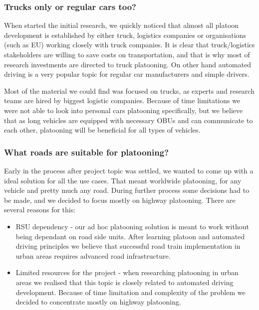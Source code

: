 \subsubsection{Trucks only or regular cars too?}
When started the initial research, we quickly noticed that almost all platoon development is established by either truck, logistics companies or organisations (such as EU) working closely with truck companies. It is clear that truck/logistics stakeholders are willing to save costs on transportation, and that is why most of research investments are directed to truck platooning. On other hand automated driving is a very popular topic for regular car manufacturers and simple drivers.\par
Most of the material we could find was focused on trucks, as experts and research teams are hired by biggest logistic companies. Because of time limitations we were not able to look into personal cars platooning specifically, but we believe that as long vehicles are equipped with necessary \acrshort{OBU}s and can communicate to each other, platooning will be beneficial for all types of vehicles.\par
%
\subsubsection{What roads are suitable for platooning?}
Early in the process after project topic was settled, we wanted to come up with a ideal solution for all the use cases. That meant worldwide platooning, for any vehicle and pretty much any road. During further process some decisions had to be made, and we decided to focus mostly on highway platooning. There are several reasons for this:
\begin{itemize}
    \item \acrshort{RSU} dependency - our ad hoc platooning solution is meant to work without being dependant on road side units. After learning platoon and automated driving principles we believe that successful road train implementation in urban areas requires advanced road infrastructure.
    \item Limited resources for the project - when researching platooning in urban areas we realised that this topic is closely related to automated driving development. Because of time limitation and complexity of the problem we decided to concentrate mostly on highway platooning.
\end{itemize}
%
